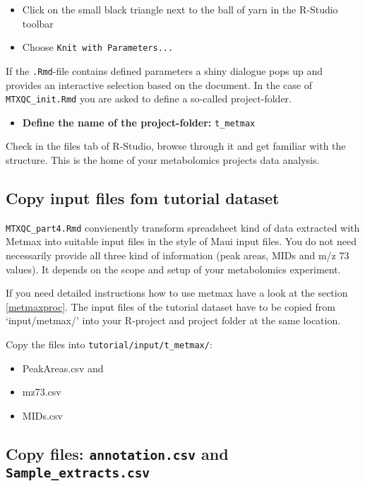 \documentclass[]{book}
\providecommand{\tightlist}{%
  \setlength{\itemsep}{0pt}\setlength{\parskip}{0pt}}
\begin{document}
\begin{itemize}
\tightlist
\item
  Click on the small black triangle next to the ball of yarn in the R-Studio toolbar
\item
  Choose \texttt{Knit\ with\ Parameters...}
\end{itemize}

If the \texttt{.Rmd}-file contains defined parameters a shiny dialogue pops up and provides an interactive selection based on the document. In the case of \texttt{MTXQC\_init.Rmd} you are asked to define a so-called project-folder.

\begin{itemize}
\tightlist
\item
  \textbf{Define the name of the project-folder:} \texttt{t\_metmax}
\end{itemize}

Check in the files tab of R-Studio, browse through it and get familiar with the structure. This is the home of your metabolomics projects data analysis.

\hypertarget{copy-input-files-fom-tutorial-dataset}{%
\subsection{Copy input files fom tutorial dataset}\label{copy-input-files-fom-tutorial-dataset}}

\texttt{MTXQC\_part4.Rmd} convienently transform spreadsheet kind of data extracted with Metmax into suitable input files in the style of Maui input files. You do not need necessarily provide all three kind of information (peak areas, MIDs and m/z 73 values). It depends on the scope and setup of your metabolomics experiment.

If you need detailed instructions how to use metmax have a look at the section \ref{metmaxproc}. The input files of the tutorial dataset have to be copied from `input/metmax/' into your R-project and project folder at the same location.

Copy the files into \texttt{tutorial/input/t\_metmax/}:

\begin{itemize}
\tightlist
\item
  PeakAreas.csv and
\item
  mz73.csv
\item
  MIDs.csv
\end{itemize}

\hypertarget{copy-files-annotation.csv-and-sample_extracts.csv-1}{%
\subsection{\texorpdfstring{Copy files: \texttt{annotation.csv} and \texttt{Sample\_extracts.csv}}{Copy files: annotation.csv and Sample\_extracts.csv}}\label{copy-files-annotation.csv-and-sample_extracts.csv-1}}
\end{document}
